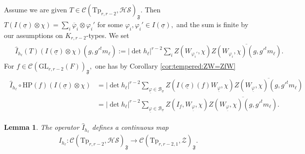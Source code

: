 \documentclass[12pt]{amsart}
\newtheorem{lem}[thm]{Lemma}
\theoremstyle{remark}
\numberwithin{equation}{section}
\newcommand{\GL}{\mathrm{GL}}
\newcommand{\lto}{\longrightarrow}
\theoremstyle{definition}
\numberwithin{equation}{subsection}
\begin{document}
Assume we are given $T \in \mathcal{C}(\mathrm{Tp}_{r,r-2},\mathcal{HS})_{\mathfrak{F}}.$  Then  
$
T(I(\underline{\sigma}) \otimes \chi)=\sum_{i} \overline{\varphi}_{i} \otimes \varphi_i'
$
for some $\varphi_i, \varphi_i' \in I(\underline{\sigma}),$ and the sum is finite by our assumptions on $K_{r,r-2}$-types.   
We set 
\begin{align} \label{Ih} \begin{split}
&\widehat{I}_{h_\ell}(T)(I(\underline{\sigma}) \otimes \chi)(g,g'^tm_\ell):=|\det h_\ell|^{r-2}\sum_{i} Z(W_{\varphi_i'},\chi)\overline{Z(W_{\varphi_i},\chi)(g,g'^tm_\ell)}. \end{split}
\end{align}
For $f \in \mathcal{C}(\GL_{r,r-2}(F))_{\mathfrak{F}},$ one has by Corollary \ref{cor:tempered:ZW=ZfW}
\begin{align} \label{Ihcirc}
\begin{split}
\widehat{I}_{h_\ell} \circ\mathrm{HP}(f)(I(\underline{\sigma}) \otimes \chi) &=|\det h_\ell|^{r-2} \sum_{\underline{\varphi} \in \mathcal{B}_{\underline{\sigma}}} Z(I(\underline{\sigma})(f)W_{\underline{\varphi}},\chi)\overline{Z(W_{\underline{\varphi}},\chi)(g,g'^tm_\ell)}\\
&=|\det h_\ell|^{r-2}\sum_{\underline{\varphi} \in \mathcal{B}_{\underline{\sigma}}} Z(I_f,W_{\underline{\varphi}},\chi)\overline{Z(W_{\underline{\varphi}},\chi)(g,g'^tm_\ell)}.
\end{split}
\end{align}


\begin{lem} \label{lem:dense:cont}
The operator $\widehat{I}_{h_\ell}$  defines a continuous map
\begin{align*}
\widehat{I}_{h_\ell}:\mathcal{C}(\mathrm{Tp}_{r,r-2},\mathcal{HS})_{\mathfrak{F}} \lto \mathcal{C}(\mathrm{Tp}_{r,r-2,1},\mathcal{Z})_{\mathfrak{F}}.
\end{align*}
\end{lem}
\end{document}
